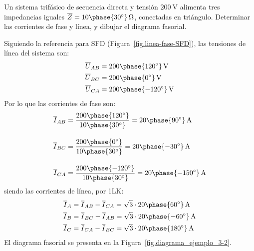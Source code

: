 	\vspace{4mm}
    \begin{example}\label{ej.3-2}
	    Un sistema trifásico de secuencia directa y tensión $\qty{200}{\volt}$ alimenta tres impedancias iguales $\overline{Z}=10\phase{30^\circ}\,\Omega$, conectadas en triángulo. Determinar las corrientes de fase y línea, y dibujar el diagrama fasorial.

        \vspace{1mm}
	    \hspace*{-5mm}\hrulefill
        
        \vspace{4mm}
    
        Siguiendo la referencia para SFD (Figura~\ref{fig.linea-fase-SFD}), las tensiones de línea del sistema son:
	    \begin{align*}
	        \overline{U}_{AB}&=200\phase{120^\circ}\,\si{\volt}\\
	        \overline{U}_{BC}&=200\phase{0^\circ}\,\si{\volt}\\
	        \overline{U}_{CA}&=200\phase{-120^\circ}\,\si{\volt}
	    \end{align*}
	    Por lo que las corrientes de fase son:
	    \begin{align*}
	        \overline{I}_{AB} &= \frac{200\phase{120^\circ}}{10\phase{30^\circ}} =20\phase{90^\circ} \,\si{\ampere} \\[10pt]
          \overline{I}_{BC} &= \frac{200\phase{0^\circ}}{10\phase{30^\circ}} = 20\phase{-30^\circ} \,\si{\ampere}\\[10pt]
          \overline{I}_{CA} &=\frac{200\phase{-120^\circ}}{10\phase{30^\circ}} = 20\phase{-150^\circ} \,\si{\ampere}
	    \end{align*}
	    siendo las corrientes de línea, por 1LK:
	    \begin{align*}
	        \overline{I}_A&= \overline{I}_{AB}-\overline{I}_{CA} = \sqrt{3}\cdot 20\phase{60^\circ}\,\si{\ampere}\\
	        \overline{I}_B&= \overline{I}_{BC}-\overline{I}_{AB} = \sqrt{3}\cdot 20\phase{-60^\circ}\,\si{\ampere}\\
	        \overline{I}_C&= \overline{I}_{CA}-\overline{I}_{BC} = \sqrt{3}\cdot 20\phase{180^\circ}\,\si{\ampere}
	    \end{align*}
	    El diagrama fasorial se presenta en la Figura~\ref{fig.diagrama_ejemplo_3-2}. 
	    \begin{figure}[H]
	        \centering

\end{figure}
\end{example}
